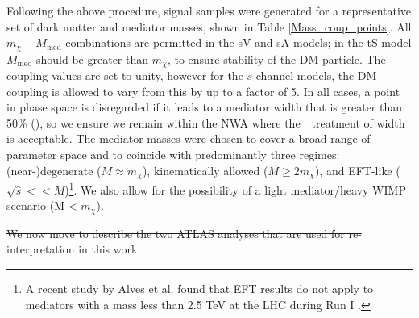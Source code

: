Following the above procedure, signal samples were generated for a representative set of dark matter and mediator masses, shown in Table \ref{Mass_coup_points}. All $m_{\chi}-M_{\mathrm{med}}$ combinations are permitted in the sV and sA models; in the tS model $M_{\mathrm{med}}$ should be greater than $m_{\chi}$, to ensure stability of the DM particle. The coupling values are set to unity, however for the $s$-channel models, the DM-coupling is allowed to vary from this by up to a factor of 5. In all cases, a point in phase space is disregarded if it leads to a mediator width that is greater than 50\% (), so we ensure we remain within the NWA where the \MG$\mbox{ }$treatment of width is acceptable. The mediator masses were chosen to cover a broad range of parameter space and to coincide with predominantly three regimes: (near-)degenerate ($M\approx m_{\chi}$), kinematically allowed ($M \geq 2m_{\chi}$), and EFT-like ($\sqrt{\hat{s}} << M$)\footnote{A recent study by Alves et al. found that EFT results do not apply to mediators with a mass less than 2.5 TeV at the LHC during Run I \cite{Alves:2011wf}.}. We also allow for the possibility of a light mediator/heavy WIMP scenario (M < $m_{\chi}$).

\st{We now move to describe the two ATLAS analyses that are used for re-interpretation in this work.}


